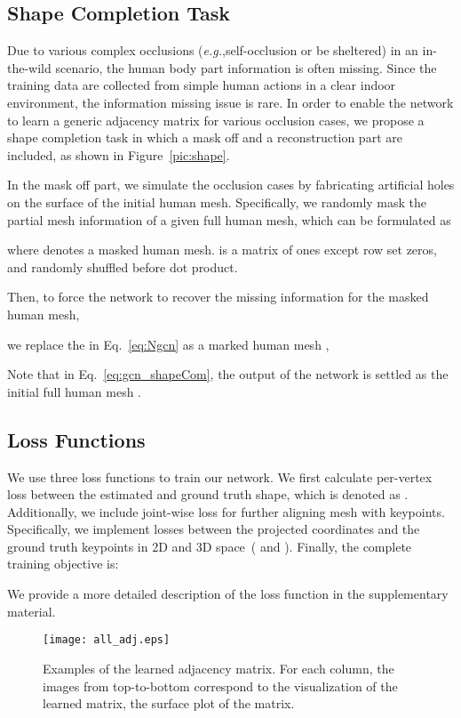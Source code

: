 \documentclass[sigplan]{acmart}
\def\eg{\emph{e.g.}}
\begin{document}
\subsection{Shape Completion Task}
\label{subsec:shape}

Due to various complex occlusions (\eg,self-occlusion or be sheltered) in an in-the-wild scenario, the human body part information is often missing. Since the training data are collected from simple human actions in a clear indoor environment, the information missing issue is rare. In order to enable the network to learn a generic adjacency matrix for various occlusion cases, we propose a shape completion task in which a mask off and a reconstruction part are included, as shown in Figure~\ref{pic:shape}.

In the mask off part, we simulate the occlusion cases by fabricating artificial holes on the surface of the initial human mesh. 
Specifically, we randomly mask the partial mesh information of a given full human mesh, which can be formulated as 

where  denotes a masked human mesh.  is a matrix of ones except  row set zeros, and randomly shuffled before dot product. 

Then, to force the network to recover the missing information for the masked human mesh, 

we replace the  in Eq.~\eqref{eq:Ngcn} as a marked human mesh , 


Note that in Eq.~\eqref{eq:gcn_shapeCom}, the output of the network is settled as the initial full human mesh . 
\subsection{Loss Functions}
\label{app:loss}

We use three loss functions to train our network. We first calculate per-vertex  loss between the estimated and ground truth shape, which is denoted as . Additionally, we include joint-wise loss for further aligning mesh with keypoints. Specifically, we implement  losses between the projected coordinates and the ground truth keypoints in 2D and 3D space~( and ). Finally, the complete training objective is: 


We provide a more detailed description of the loss function in the supplementary material.

\begin{figure*}[!t]
\centering
\texttt{[image: all\_adj.eps]}
\caption{Examples of the learned adjacency matrix. For each column, the images from top-to-bottom correspond to the visualization of the learned matrix, the surface plot of the matrix.}
\label{pic:allAdj}
\end{figure*}
\end{document}

